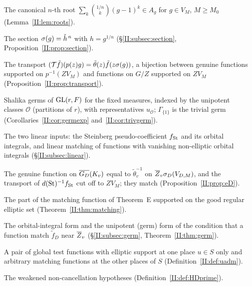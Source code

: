 \begin{description}[style=nextline,leftmargin=1.5em]
\item[$g^{1/n}$] The canonical $n$-th root $\sum_k\binom{1/n}{k}(g-1)^k\in A_g$ for $g\in V_M$, $M\ge M_0$ (Lemma~\ref{II:lem:roots}).
\item[$\sg$, $\sg_D$, $\sg_{\GL}$] The section $\sigma(g)=\tilde h^{\,n}$ with $h=g^{1/n}$ (\S\ref{II:subsec:section}, Proposition~\ref{II:prop:section}).
\item[$\mathcal T$, $\mathcal T_D$; $C_c^\infty(\Gb,\tilde\theta)_{\gen,M}$, $C_c^\infty(G/Z)_M$] The transport $(\mathcal T\tilde f)(p(z)g)=\tilde\theta(z)\tilde f(z\sigma(g))$, a bijection between genuine functions supported on $p^{-1}(ZV_M)$ and functions on $G/Z$ supported on $ZV_M$ (Proposition~\ref{II:prop:transport}).
\item[$\Gamma_{\mathcal O}$, $u_{\mathcal O}$] Shalika germs of $\operatorname{GL}(r,F)$ for the fixed measures, indexed by the unipotent classes $\mathcal O$ (partitions of $r$), with representatives $u_{\mathcal O}$; $\Gamma_{\{1\}}$ is the trivial germ (Corollaries~\ref{II:cor:germexp} and~\ref{II:cor:trivgerm}).
\item[(L1), (L2); $f_{\St}$] The two linear inputs: the Steinberg pseudo-coefficient $f_{\St}$ and its orbital integrals, and linear matching of functions with vanishing non-elliptic orbital integrals (\S\ref{II:subsec:linear}).
\item[$e_D$, $\tilde f^{\St}$] The genuine function on $\overline{G_D}(K_v)$ equal to $\tilde\theta_v^{-1}$ on $\overline{Z}_v\sigma_D(V_{D,M})$, and the transport of $d(\mathrm{St})^{-1}f_{\mathrm{St}}$ cut off to $ZV_M$; they match (Proposition~\ref{II:prop:eD}).
\item[$\tilde f_{\reg}$] The part of the matching function of Theorem~E supported on the good regular elliptic set (Theorem~\ref{II:thm:matching}).
\item[(Ell), (Non); (G1), (G2)] The orbital-integral form and the unipotent (germ) form of the condition that a function match $\tilde f_D$ near $\overline{Z}_v$ (\S\ref{II:subsec:germ}, Theorem~\ref{II:thm:germ}).
\item[$u$-admissible pair] A pair of global test functions with elliptic support at one place $u\in S$ only and arbitrary matching functions at the other places of $S$ (Definition~\ref{II:def:uadm}).
\item[$(\mathrm{Hyp}_D')$, $(\mathrm{Hyp}')$] The weakened non-cancellation hypotheses (Definition~\ref{II:def:HDprime}).
\end{description}
